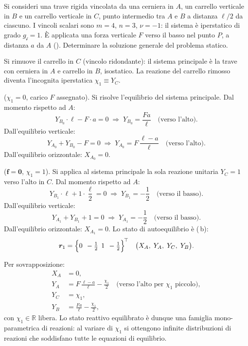 \begin{esempio}
	\label{ex:iper_stat_1}
	Si consideri una trave rigida vincolata da una cerniera in
	$A$, un carrello verticale in $B$ e un carrello verticale
	in $C$, punto intermedio tra $A$ e $B$ a distanza $\ell/2$
	da ciascuno. I vincoli scalari sono $m = 4$, $n = 3$,
	$\nu = -1$: il sistema è iperstatico di grado
	$g_{\mathscr{i}} = 1$. È applicata una forza verticale $F$
	verso il basso nel punto $P$, a distanza $a$ da $A$
	(). Determinare la soluzione
	generale del problema statico.
	
	



	
	\begin{svolgimento}
		
		Si rimuove il carrello in $C$ (vincolo ridondante): il sistema
		principale è la trave con cerniera in $A$ e carrello in $B$,
		isostatico. La reazione del carrello rimosso diventa
		l'incognita iperstatica $\chi_1 \equiv Y_C$.
		
		 ($\chi_1 = 0$,
		carico $F$ assegnato).
		Si risolve l'equilibrio del sistema principale. Dal momento
		rispetto ad $A$:
		\[
		Y_{B_0} \cdot \ell - F \cdot a = 0
		\;\Longrightarrow\;
		Y_{B_0} = \frac{Fa}{\ell}
		\quad\text{(verso l'alto)}.
		\]
		Dall'equilibrio verticale:
		\[
		Y_{A_0}+ Y_{B_0} - F = 0
		\;\Longrightarrow\;
		Y_{A_0} = F\,\frac{\ell - a}{\ell}
		\quad\text{(verso l'alto)}.
		\]
		Dall'equilibrio orizzontale: $X_{A_0} = 0$.
		
		 ($\bm{f} = \bm{0}$,
		$\chi_1 = 1$).
		Si applica al sistema principale la sola reazione unitaria
		$Y_C = 1$ verso l'alto in $C$. Dal momento rispetto ad $A$:
		\[
		Y_{B_1} \cdot \ell + 1 \cdot \frac{\ell}{2} = 0
		\;\Longrightarrow\;
		Y_{B_1} = -\frac{1}{2}
		\quad\text{(verso il basso)}.
		\]
		Dall'equilibrio verticale:
		\[
		Y_{A_1} + Y_{B_1} + 1 = 0
		\;\Longrightarrow\;
		Y_{A_1} = -\frac{1}{2}
		\quad\text{(verso il basso)}.
		\]
		Dall'equilibrio orizzontale: $X_{A_1}= 0$. Lo stato di
		autoequilibrio è (\,b):
		\[
		\bm{r}_1 =
		\Bigl\{0\,\;-\tfrac{1}{2}\,\;1\,\;-\tfrac{1}{2}\Bigr\}^{\!\top}
		\quad
		\bigl(X_A,\;Y_A,\;Y_C,\;Y_B\bigr).
		\]
		
		Per sovrapposizione:
		\begin{align*}
			X_A &= 0, \\
			Y_A &= F\,\frac{\ell-a}{\ell}
			- \frac{\chi_1}{2}
			\quad\text{(verso l'alto per $\chi_1$ piccolo)},\\
			Y_C &= \chi_1, \\
			Y_B &= \frac{Fa}{\ell} - \frac{\chi_1}{2},
		\end{align*}
		con $\chi_1 \in \mathbb{R}$ libera. Lo stato reattivo
		equilibrato è dunque una famiglia mono-parametrica di
		reazioni: al variare di $\chi_1$ si ottengono infinite
		distribuzioni di reazioni che soddisfano tutte le
		equazioni di equilibrio.
		

\end{svolgimento}
\end{esempio}
